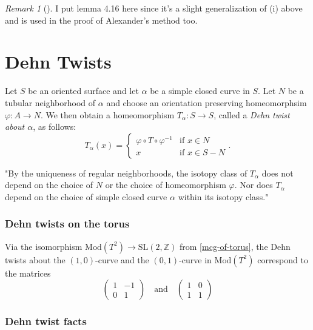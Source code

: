 \documentclass[reqno]{amsart}
\theoremstyle{definition}
\theoremstyle{remark}
\newtheorem*{remark}{Remark}
\newcommand{\SL}{{\mathrm{SL}}}
\newcommand{\Mod}{{\mathrm{Mod}}}
\begin{document}
\begin{remark}[]
    I put lemma 4.16 here since it's a slight generalization of
    (i) above and is used in the proof of Alexander's method
    too.
\end{remark}



\section{Dehn Twists}

Let $S$ be an oriented surface and let $\alpha$ be
a simple closed curve in $S$. Let $N$ be a tubular
neighborhood of $\alpha$ and choose
an orientation preserving homeomorphsim
$\varphi \colon A \to N$. We then obtain
a homeomorphism $T_{\alpha} \colon
S \to S$, called a \textit{Dehn twist about $\alpha$}, as
follows:
\[
T_{\alpha}(x) = 
\begin{cases}
    \varphi \circ T \circ \varphi^{-1}& \text{if } 
    x\in N \\
    x& \text{if } x\in S - N
\end{cases}.
\] 

"By the uniqueness of regular neighborhoods, the isotopy
class of $T_{\alpha}$ does not depend on the choice of
$N$ or the choice of homeomorphism $\varphi$. Nor
does $T_{\alpha}$ depend on the choice
of simple closed curve $\alpha$ within its isotopy class." 


\subsubsection*{Dehn twists on the torus}
Via the isomorphism
$\Mod \left( T^2 \right)  \to \SL\left( 2, \mathbb{Z} \right) $ 
from \ref{mcg-of-torus}, the Dehn twists
about the $(1,0)$-curve and the $(0,1)$-curve
in $\Mod\left( T^2 \right) $ correspond to the
matrices
\[
    \begin{pmatrix} 1 & -1 \\ 0 & 1 \end{pmatrix} 
    \quad \text{and} \quad 
    \begin{pmatrix} 1 & 0 \\ 1 & 1 \end{pmatrix} 
\] 
\subsubsection{Dehn twist facts}
\end{document}
